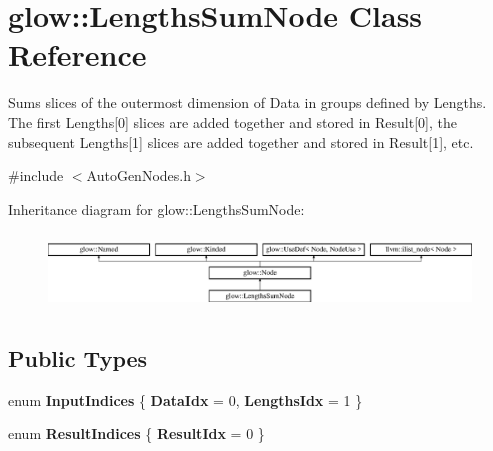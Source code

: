 \hypertarget{classglow_1_1_lengths_sum_node}{}\section{glow\+:\+:Lengths\+Sum\+Node Class Reference}
\label{classglow_1_1_lengths_sum_node}


Sums slices of the outermost dimension of Data in groups defined by Lengths. The first Lengths\mbox{[}0\mbox{]} slices are added together and stored in Result\mbox{[}0\mbox{]}, the subsequent Lengths\mbox{[}1\mbox{]} slices are added together and stored in Result\mbox{[}1\mbox{]}, etc.  




{\ttfamily \#include $<$Auto\+Gen\+Nodes.\+h$>$}

Inheritance diagram for glow\+:\+:Lengths\+Sum\+Node\+:\begin{figure}[H]
\begin{center}
\leavevmode
\includegraphics[height=2.028986cm]{classglow_1_1_lengths_sum_node}
\end{center}
\end{figure}
\subsection*{Public Types}
\begin{DoxyCompactItemize}
\item 
\mbox{\label{classglow_1_1_lengths_sum_node_ab224722529fd27995cef98fc6a962b19}} 
enum {\bfseries Input\+Indices} \{ {\bfseries Data\+Idx} = 0, 
{\bfseries Lengths\+Idx} = 1
 \}
\item 
\mbox{\label{classglow_1_1_lengths_sum_node_aa9fc8a0d98a4a6ce660171c2c231dd5c}} 
enum {\bfseries Result\+Indices} \{ {\bfseries Result\+Idx} = 0
 \}
\end{DoxyCompactItemize}
